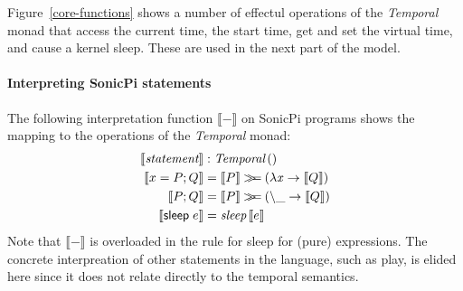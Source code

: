 \documentclass[preprint]{sigplanconf}
\newcommand{\Varid}[1]{\mathit{#1}}
\newcommand{\bind}{\mathbin{>\!\!\!>\mkern-6.7mu=}}
\theoremstyle{definition}
\newcommand{\playOp}{\textsf{play}}
\newcommand{\sleep}{\mathsf{sleep}\;}
\newcommand{\sleepOp}{\textsf{sleep}}
\newcommand{\lang}{SonicPi}
\newcommand{\interp}[1]{\llbracket{#1}\rrbracket}
\begin{document}
Figure~\ref{core-functions} shows a number of effectul operations of 
 the \emph{Temporal} monad that access the current time, the start time, get
and set the virtual time, and cause a kernel sleep. These
are used in the next part of the model. 

\paragraph{Interpreting \lang{} statements}

The following interpretation function $\interp{-}$ on \lang{} 
programs shows the mapping to the operations of the \emph{Temporal}
monad:
\begin{align*}
\interp{\emph{statement}} & : \emph{Temporal} \, () \\
\interp{x = P; Q} & = \interp{P} \ensuremath{\bind (\lambda \Varid{x}\to } \interp{Q}) \\
\interp{P; Q} & = \interp{P} \ensuremath{\bind (\mathbin{\char92 \char95 }\to } \interp{Q}) \\
\interp{\sleep e} & = \emph{sleep} \, \interp{e}
\end{align*}
Note that $\interp{-}$ is overloaded in the rule for \sleepOp{} for (pure) expressions. 
The concrete interpreation of other statements in the language, such as \playOp, is
elided here since it does not relate directly to the temporal semantics. 
\end{document}
